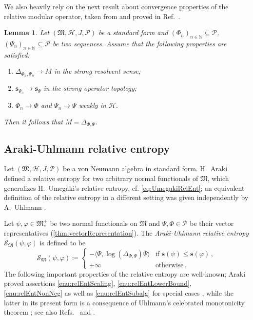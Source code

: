 \documentclass[a4paper, twoside, 11pt, reqno]{amsart}
\theoremstyle{definition}
\theoremstyle{plain}
\newtheorem{lemma}[definition]{Lemma}
\renewcommand{\subset}{\subseteq}
\renewcommand{\Delta}{\varDelta}
\renewcommand{\Phi}{\varPhi}
\renewcommand{\Psi}{\varPsi}
\newcommand{\N}{\mathbb{N}}
\newcommand{\MH}{\mathcal{H}}
\newcommand{\MS}{\mathcal{S}}
\newcommand{\MFM}{\mathfrak{M}}
\newcommand{\NF}[1]{#1_{\ast}^{+}}
\newcommand{\NPC}{\mathcal{P}}
\newcommand{\1}{\mathbf{1}}
\newcommand{\ssupp}{\mathbf{s}}
\newcommand{\braket}[2][]{#1\langle{#2}#1\rangle}
\newcommand{\ce}{\coloneqq}
\begin{document}
We also heavily rely on the next result about convergence properties of the relative modular operator, taken from and proved in Ref.~\cite[Thm. 4.2]{DJP03}.

\begin{lemma}\label{lem:convRelModOp}
    Let $(\MFM, \MH, J, \NPC)$ be a standard form and $(\Phi_n)_{n \in \N} \subset \NPC$, $(\Psi_n)_{n \in \N} \subset \NPC$ be two sequences. Assume that the following properties are satisfied:
    \begin{enumerate}[label=\normalfont(\greek*)]
        \item $\Delta_{\Phi_n, \Psi_n} \to M$ in the strong resolvent sense;
        \item $\ssupp_{\Psi_n} \to \ssupp_\Psi$ in the strong operator topology;
        \item $\Phi_n \to \Phi$ and $\Psi_n \to \Psi$ weakly in $\MH$.
    \end{enumerate}
    Then it follows that $M = \Delta_{\Phi, \Psi}$.
\end{lemma}


\subsection{Araki-Uhlmann relative entropy}

Let $(\MFM, \MH, J, \NPC)$ be a von Neumann algebra in standard form. H.~Araki \cite{Araki1976, Araki1977} defined a relative entropy for two arbitrary normal functionals of $\MFM$, which generalizes H.~Umegaki's relative entropy, cf. \cref{eq:UmegakiRelEnt}; an equivalent definition of the relative entropy in a different setting was given independently by A.~Uhlmann \cite{Uhlmann1977}.

Let $\psi, \varphi \in \NF{\MFM}$ be two normal functionals on $\MFM$ and $\Psi, \Phi \in \NPC$ be their vector representatives (\cref{thm:vectorRepresentation}). The \emph{Araki-Uhlmann relative entropy} $\MS_\MFM(\psi, \varphi)$ is defined to be
\begin{equation}\label{eq:relativeEntropy}
    \MS_\MFM(\psi, \varphi) \ce
    \begin{cases}
        - \braket[\big]{\Psi, \log (\Delta_{\Phi, \Psi}) \Psi} & \text{if $\ssupp(\psi) \le \ssupp(\varphi)$} \, , \\
        + \infty & \text{otherwise} \, .
    \end{cases}
\end{equation}
The following important properties of the relative entropy are well-known; Araki proved assertions \ref{enu:relEntScaling}, \ref{enu:relEntLowerBound}, \ref{enu:relEntNonNeg} \cite[Lem. 3.2 \& Thm. 3.6]{Araki1977} as well as \ref{enu:relEntSubalg} for special cases \cite[Thm. 3.8]{Araki1977}, while the latter in its present form is a consequence of Uhlmann's celebrated monotonicity theorem \cite[Prop. 18]{Uhlmann1977}; see also Refs.~\cite[Prop. 5.1 \& Thm. 5.3]{OP2004} and \cite[Thm. 1 \& Cor. 2]{Petz1986a}.
\end{document}
